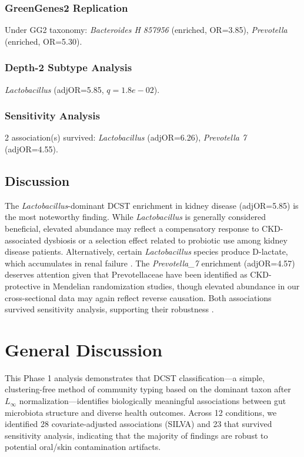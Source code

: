 \documentclass[11pt,a4paper]{article}
\begin{document}
\subsubsection{GreenGenes2 Replication}
Under GG2 taxonomy: \textit{Bacteroides H 857956} (enriched, OR=3.85), \textit{Prevotella} (enriched, OR=5.30).

\subsubsection{Depth-2 Subtype Analysis}
\textit{Lactobacillus} (adjOR=5.85, $q=1.8e-02$).

\subsubsection{Sensitivity Analysis}
2 association(s) survived: \textit{Lactobacillus} (adjOR=6.26), \textit{Prevotella 7} (adjOR=4.55).

\subsection{Discussion}
The \textit{Lactobacillus}-dominant DCST enrichment in kidney disease (adjOR=5.85) is the most noteworthy finding. While \textit{Lactobacillus} is generally considered beneficial, elevated abundance may reflect a compensatory response to CKD-associated dysbiosis or a selection effect related to probiotic use among kidney disease patients. Alternatively, certain \textit{Lactobacillus} species produce D-lactate, which accumulates in renal failure \cite{Vaziri2013_CKD}. The \textit{Prevotella\_7} enrichment (adjOR=4.57) deserves attention given that Prevotellaceae have been identified as CKD-protective in Mendelian randomization studies, though elevated abundance in our cross-sectional data may again reflect reverse causation. Both associations survived sensitivity analysis, supporting their robustness \cite{Tang2015_TMAO_CKD}.
\newpage


\section{General Discussion}

This Phase 1 analysis demonstrates that DCST classification---a simple, clustering-free method of community typing based on the dominant taxon after $L_\infty$ normalization---identifies biologically meaningful associations between gut microbiota structure and diverse health outcomes. Across 12 conditions, we identified 28 covariate-adjusted associations (SILVA) and 23 that survived sensitivity analysis, indicating that the majority of findings are robust to potential oral/skin contamination artifacts.
\end{document}
